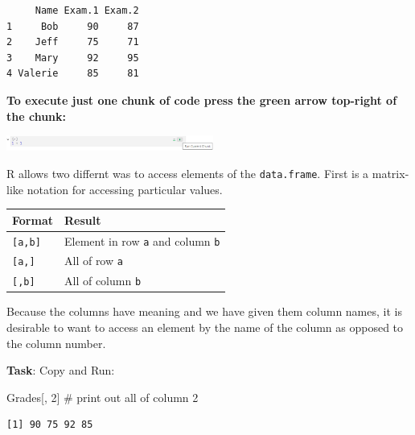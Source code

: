\documentclass[
  letterpaper,
  DIV=11,
  numbers=noendperiod]{scrreprt}
\newenvironment{Shaded}{\begin{snugshade}}{\end{snugshade}}
\newcommand{\CommentTok}[1]{\textcolor[rgb]{0.37,0.37,0.37}{#1}}
\newcommand{\DecValTok}[1]{\textcolor[rgb]{0.68,0.00,0.00}{#1}}
\newcommand{\NormalTok}[1]{\textcolor[rgb]{0.00,0.23,0.31}{#1}}
\newcommand{\SpecialCharTok}[1]{\textcolor[rgb]{0.37,0.37,0.37}{#1}}
\begin{document}
\begin{verbatim}
     Name Exam.1 Exam.2
1     Bob     90     87
2    Jeff     75     71
3    Mary     92     95
4 Valerie     85     81
\end{verbatim}

\textbf{To execute just one chunk of code press the green arrow
top-right of the chunk:}

\includegraphics[width=2.68in,height=\textheight,keepaspectratio]{labs/../img/runChunk.png}

R allows two differnt was to access elements of the \texttt{data.frame}.
First is a matrix-like notation for accessing particular values.

\begin{longtable}[]{@{}ll@{}}
\toprule\noalign{}
Format & Result \\
\midrule\noalign{}
\endhead
\bottomrule\noalign{}
\endlastfoot
\texttt{{[}a,b{]}} & Element in row \texttt{a} and column \texttt{b} \\
\texttt{{[}a,{]}} & All of row \texttt{a} \\
\texttt{{[},b{]}} & All of column \texttt{b} \\
\end{longtable}

Because the columns have meaning and we have given them column names, it
is desirable to want to access an element by the name of the column as
opposed to the column number.

\textbf{Task}: Copy and Run:

\begin{Shaded}
\begin{Highlighting}[]
\NormalTok{Grades[, }\DecValTok{2}\NormalTok{]       }\CommentTok{\# print out all of column 2 }
\end{Highlighting}
\end{Shaded}

\begin{verbatim}
[1] 90 75 92 85
\end{verbatim}

\begin{Shaded}
\end{Shaded}
\end{document}
